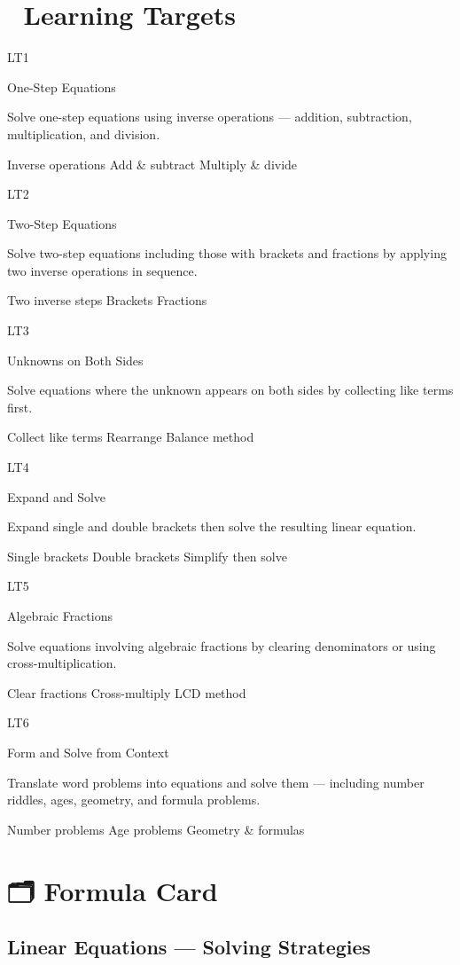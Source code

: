 \documentclass[
  letterpaper,
  DIV=11,
  numbers=noendperiod]{scrreprt}
\theoremstyle{definition}
\theoremstyle{remark}
\begin{document}
\section{🎯 Learning Targets}\label{learning-targets-4}

LT1

One-Step Equations

Solve one-step equations using inverse operations --- addition,
subtraction, multiplication, and division.

{Inverse operations} {Add \& subtract} {Multiply \& divide}

LT2

Two-Step Equations

Solve two-step equations including those with brackets and fractions by
applying two inverse operations in sequence.

{Two inverse steps} {Brackets} {Fractions}

LT3

Unknowns on Both Sides

Solve equations where the unknown appears on both sides by collecting
like terms first.

{Collect like terms} {Rearrange} {Balance method}

LT4

Expand and Solve

Expand single and double brackets then solve the resulting linear
equation.

{Single brackets} {Double brackets} {Simplify then solve}

LT5

Algebraic Fractions

Solve equations involving algebraic fractions by clearing denominators
or using cross-multiplication.

{Clear fractions} {Cross-multiply} {LCD method}

LT6

Form and Solve from Context

Translate word problems into equations and solve them --- including
number riddles, ages, geometry, and formula problems.

{Number problems} {Age problems} {Geometry \& formulas}

\section{🗂️ Formula Card}\label{formula-card-1}

\subsection*{Linear Equations --- Solving
Strategies}\label{linear-equations-solving-strategies}
\end{document}
